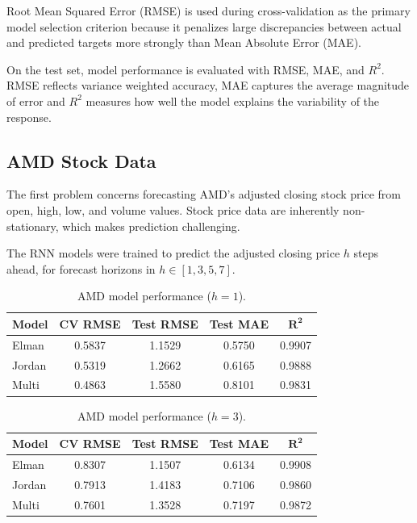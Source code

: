 \documentclass[conference]{IEEEtran}
\begin{document}
Root Mean Squared Error (RMSE) is used during cross-validation as the primary model selection criterion because it penalizes large discrepancies between actual and predicted targets more strongly than Mean Absolute Error (MAE).

On the test set, model performance is evaluated with RMSE, MAE, and $R^2$. RMSE reflects variance weighted accuracy, MAE captures the average magnitude of error and $R^2$ measures how well the model explains the variability of the response.

\subsection{\textbf{AMD Stock Data}}
The first problem concerns forecasting AMD's adjusted closing stock price from open, high, low, and volume values. Stock price data are inherently non-stationary, which makes prediction challenging.

The RNN models were trained to predict the adjusted closing price $h$ steps ahead, for forecast horizons in $h \in [1,3,5,7]$.

\begin{table}[H]
\centering
\caption{AMD model performance ($h=1$).}
\label{tab:amd_h1}
\begin{tabular}{lcccc}
\toprule
\textbf{Model} & \textbf{CV RMSE} & \textbf{Test RMSE} & \textbf{Test MAE} & $\mathbf{R^2}$ \\
\midrule
Elman  & 0.5837 & 1.1529 & 0.5750 & 0.9907 \\
Jordan & 0.5319 & 1.2662 & 0.6165 & 0.9888 \\
Multi  & 0.4863 & 1.5580 & 0.8101 & 0.9831 \\
\bottomrule
\end{tabular}
\end{table}

\begin{table}[H]
\centering
\caption{AMD model performance ($h=3$).}
\label{tab:amd_h3}
\begin{tabular}{lcccc}
\toprule
\textbf{Model} & \textbf{CV RMSE} & \textbf{Test RMSE} & \textbf{Test MAE} & $\mathbf{R^2}$ \\
\midrule
Elman  & 0.8307 & 1.1507 & 0.6134 & 0.9908 \\
Jordan & 0.7913 & 1.4183 & 0.7106 & 0.9860 \\
Multi  & 0.7601 & 1.3528 & 0.7197 & 0.9872 \\
\bottomrule
\end{tabular}
\end{table}
\end{document}
